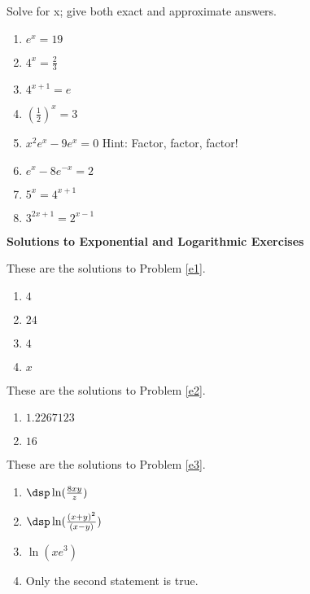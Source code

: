 \begin{prb} \label{e6}
Solve for x; give both exact and approximate answers.
    \begin{enumerate}
    \item $e^x = 19$
    \item $4^x = \frac{2}{3}$
    \item $4^{x+1} = e$
    \item $(\frac{1}{2})^x = 3$
    \item $x^2 e^x - 9 e^x = 0$ \hspace{.25in} Hint: Factor, factor, factor!
    \item $e^x - 8e^{-x} = 2$
    \item $5^x = 4^{x+1}$
    \item $3^{2x+1} = 2^{x-1}$
    \end{enumerate}
\end{prb}

\noindent
\textbf{Solutions to Exponential and Logarithmic Exercises}

\begin{sol}
These are the solutions to Problem \ref{e1}.
    \begin{enumerate}
    \item $4$
    \item $24$
    \item $4$
    \item $x$
    \end{enumerate}
\end{sol}

\begin{sol}
These are the solutions to Problem \ref{e2}.
    \begin{enumerate}
    \item $1.2267123$
    \item $16$
    \end{enumerate}
\end{sol}

\begin{sol}
These are the solutions to Problem \ref{e3}.
    \begin{enumerate}
    \item $\dsp \ln(\frac{8xy}{z})$
    \item $\dsp \ln(\frac{(x+y)^2}{(x-y)})$
    \item $\ln(xe^3)$
    \item Only the second statement is true.
    \end{enumerate}
\end{sol}

